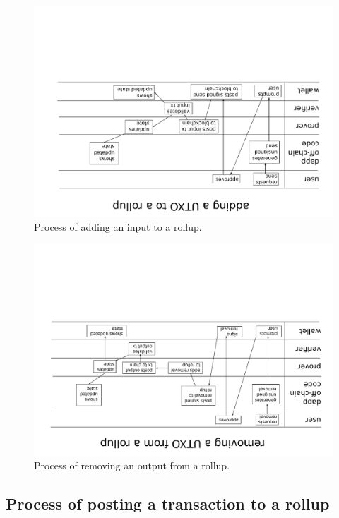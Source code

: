 \documentclass[12pt]{article}
\begin{document}
\begin{figure}
	\includegraphics[angle=180,width=1.0\columnwidth]{process-diagram-b.pdf}
	\caption{Process of adding an input to a rollup.}
	\label{fig:process-b}
\end{figure}

\begin{figure}
	\includegraphics[angle=180,width=1.0\columnwidth]{process-diagram-c.pdf}
	\caption{Process of removing an output from a rollup.}
	\label{fig:process-c}
\end{figure}

\subsection{Process of posting a transaction to a rollup}
\end{document}
